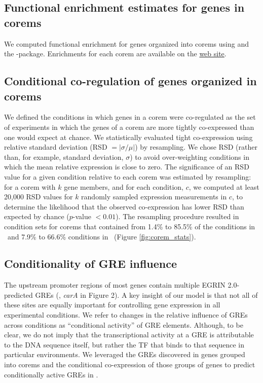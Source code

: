 \subsection{Functional enrichment estimates for genes in corems}

We computed functional enrichment for genes organized into corems
using  \cite{Dennis2003} and the
 \cite{Day2010}
-package. Enrichments for each corem are available on the
\href{http://egrin2.systemsbiology.net}{web site}.

\subsection{Conditional co-regulation of genes organized in corems}
\label{section:rsd}

We defined the conditions in which genes in a corem were co-regulated
as the set of experiments in which the genes of a corem are more
tightly co-expressed than one would expect at chance. We statistically
evaluated tight co-expression using relative standard deviation (RSD 
$=|\sigma/\mu|$) by resampling. We chose RSD (rather than, for example,
standard deviation, $\sigma$) to avoid over-weighting conditions in which the
mean relative expression is close to zero. The significance of an RSD
value for a given condition relative to each corem was estimated
by resampling: for a corem with $k$ gene members, and for each
condition, $c$, we computed at least 20,000 RSD values for $k$ randomly
sampled expression measurements in $c$, to determine the likelihood that the
observed co-expression has lower RSD than expected by chance ($p$-value
$< 0.01$). The resampling procedure resulted in condition sets for
corems that contained from 1.4\% to 85.5\% of the conditions in
\halo\ and 7.9\% to 66.6\% conditions in \eco\ (Figure \ref{fig:corem_stats}).

\subsection{Conditionality of GRE influence}

The upstream promoter regions of most genes contain multiple EGRIN
2.0-predicted GREs (\eg, \textit{carA} in Figure 2). A key insight of our model
is that not all of these sites are equally important for controlling
gene expression in all experimental conditions. We refer to changes in
the relative influence of GREs across conditions as ``conditional
activity'' of GRE elements. Although, to be clear, we do not imply
that the transcriptional activity at a GRE is attributable to the DNA
sequence itself, but rather the TF that binds to that sequence in
particular environments. We leveraged the GREs discovered in genes
grouped into corems and the conditional co-expression of those groups
of genes to predict conditionally active GREs in \egrine.

